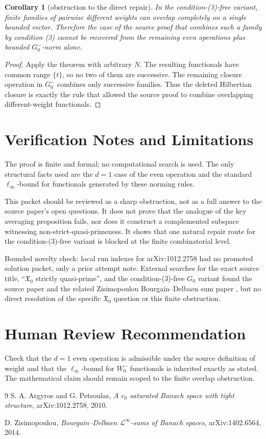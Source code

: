 \documentclass[11pt]{article}
\newtheorem{corollary}{Corollary}
\newcommand{\Xzero}{\mathfrak X_0}
\newcommand{\Gminus}{G_0^-}
\newcommand{\Wminus}{W_0^-}
\begin{document}
\begin{corollary}[obstruction to the direct repair]
In the condition-(3)-free variant, finite families of pairwise different
weights can overlap completely on a single bounded vector.  Therefore the
case of the source proof that combines such a family by condition (3)
cannot be recovered from the remaining even operations plus bounded
\(\Gminus\)-norm alone.
\end{corollary}

\begin{proof}
Apply the theorem with arbitrary \(N\).  The resulting functionals have
common range \(\{t\}\), so no two of them are successive.  The remaining
closure operation in \(\Gminus\) combines only successive families.  Thus
the deleted Hilbertian closure is exactly the rule that allowed the source
proof to combine overlapping different-weight functionals.
\end{proof}

\section*{Verification Notes and Limitations}

The proof is finite and formal; no computational search is used.  The only
structural facts used are the \(d=1\) case of the even operation and the
standard \(\ell_\infty\)-bound for functionals generated by these norming
rules.

This packet should be reviewed as a sharp obstruction, not as a full answer
to the source paper's open questions.  It does not prove that the analogue
of the key averaging proposition fails, nor does it construct a complemented
subspace witnessing non-strict-quasi-primeness.  It shows that one natural
repair route for the condition-(3)-free variant is blocked at the finite
combinatorial level.

Bounded novelty check: local run indexes for arXiv:1012.2758 had no promoted
solution packet, only a prior attempt note.  External searches for the exact
source title, ``\(\mathfrak X_0\) strictly quasi-prime'', and the
condition-(3)-free \(G_0\) variant found the source paper and the related
Zisimopoulou Bourgain--Delbaen sum paper \cite{Z}, but no direct resolution
of the specific \(\Xzero\) question or this finite obstruction.

\section*{Human Review Recommendation}

Check that the \(d=1\) even operation is admissible under the source
definition of weight and that the \(\ell_\infty\)-bound for \(\Wminus\)
functionals is inherited exactly as stated.  The mathematical claim should
remain scoped to the finite overlap obstruction.

\begin{thebibliography}{9}
S. A. Argyros and G. Petsoulas,
\emph{A \(c_0\) saturated Banach space with tight structure},
arXiv:1012.2758, 2010.

D. Zisimopoulou,
\emph{Bourgain--Delbaen \(\mathcal L^\infty\)-sums of Banach spaces},
arXiv:1402.6564, 2014.
\end{thebibliography}
\end{document}
